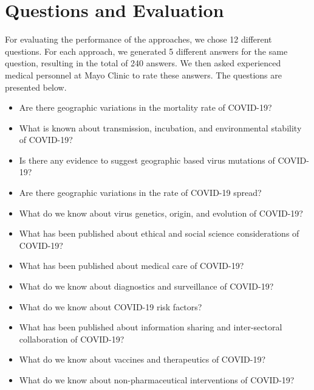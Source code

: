 \documentclass[sigconf,natbib=false]{acmart}
\begin{document}

\section{Questions and Evaluation}

For evaluating the performance of the approaches, we chose 12 different
questions. For each approach, we generated 5 different answers for the same
question, resulting in the total of 240 answers. We then asked experienced
medical personnel at Mayo Clinic to rate these answers. The questions are
presented below.

\begin{itemize}
  \item Are there geographic variations in the mortality rate of COVID-19?
  \item What is known about transmission, incubation, and environmental stability of COVID-19?
  \item Is there any evidence to suggest geographic based virus mutations of COVID-19?
  \item Are there geographic variations in the rate of COVID-19 spread?
  \item What do we know about virus genetics, origin, and evolution of COVID-19?
  \item What has been published about ethical and social science considerations of COVID-19?
  \item What has been published about medical care of COVID-19?
  \item What do we know about diagnostics and surveillance of COVID-19?
  \item What do we know about COVID-19 risk factors?
  \item What has been published about information sharing and inter-sectoral collaboration of COVID-19?
  \item What do we know about vaccines and therapeutics of COVID-19?
  \item What do we know about non-pharmaceutical interventions of COVID-19?
\end{itemize}

\end{document}
